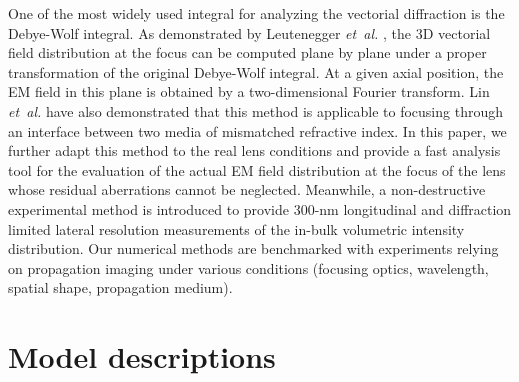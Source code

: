 \documentclass[9pt,twocolumn,twoside]{osajnl}
\begin{document}
One of the most widely used integral for analyzing the vectorial diffraction is the Debye-Wolf integral. As demonstrated by Leutenegger \emph{et~al.} \cite{leutenegger2006fast}, the 3D vectorial field distribution at the focus can be computed plane by plane under a proper transformation of the original Debye-Wolf integral. At a given axial position, the EM field in this plane is obtained by a two-dimensional Fourier transform. Lin \emph{et~al.} \cite{Lin2012} have also demonstrated that this method is applicable to focusing through an interface between two media of mismatched refractive index. In this paper, we further adapt this method to the real lens conditions and provide a fast analysis tool for the evaluation of the actual EM field distribution at the focus of the lens whose residual aberrations cannot be neglected. Meanwhile, a non-destructive experimental method is introduced to provide 300-nm longitudinal and diffraction limited lateral resolution measurements of the in-bulk volumetric intensity distribution. Our numerical methods are benchmarked with experiments relying on propagation imaging under various conditions (focusing optics, wavelength, spatial shape, propagation medium).




\section{Model descriptions} \label{section:2}
\end{document}

